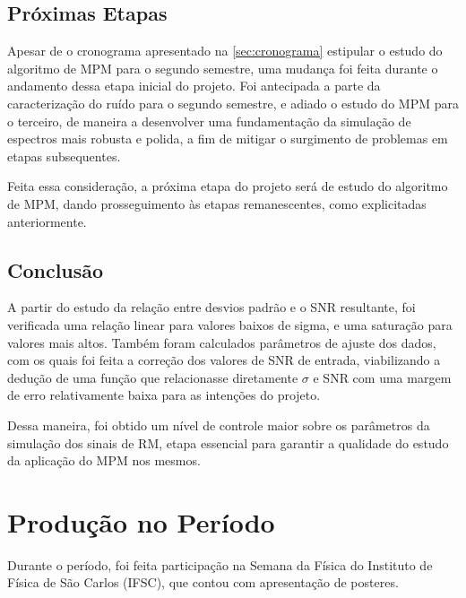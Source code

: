 \documentclass[12pt]{article}
\begin{document}
\subsection{Próximas Etapas}

Apesar de o cronograma apresentado na \autoref{sec:cronograma} estipular o estudo do algoritmo de MPM para o segundo semestre,
uma mudança foi feita durante o andamento dessa etapa inicial do projeto. Foi antecipada a parte da caracterização do ruído para o segundo semestre, e adiado o estudo do MPM 
para o terceiro, de maneira a desenvolver uma fundamentação da simulação de espectros mais robusta e polida, a fim de mitigar o surgimento de problemas em etapas subsequentes.

Feita essa consideração, a próxima etapa do projeto será de estudo do algoritmo de MPM, dando prosseguimento às etapas remanescentes, como explicitadas anteriormente.

\subsection{Conclusão}

A partir do estudo da relação entre desvios padrão e o SNR resultante, 
foi verificada uma relação linear para valores baixos de sigma, e uma 
saturação para valores mais altos. Também foram calculados 
parâmetros de ajuste dos dados, com os quais foi feita a correção dos 
valores de SNR de entrada, viabilizando a dedução de uma função que 
relacionasse diretamente $\sigma$ e SNR com uma margem de erro 
relativamente baixa para as intenções do projeto. 

Dessa maneira, foi obtido um nível de controle maior sobre os parâmetros da simulação dos sinais de RM, etapa essencial para 
garantir a qualidade do estudo da aplicação do MPM nos mesmos.




\section{Produção no Período}

Durante o período, foi feita participação na Semana da Física do Instituto de Física de São Carlos (IFSC),
que contou com apresentação de posteres.
\end{document}
